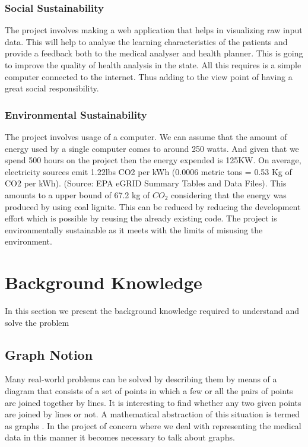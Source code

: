 \subsection{Social Sustainability}
The project involves making a web application that helps in visualizing raw input data.
This will help to analyse the learning characteristics of the patients and
provide a feedback both to the medical analyser and health planner. This is going to improve
the quality of health analysis in the state. All this requires is a simple computer connected to
the internet.  Thus  adding to the view point of having a great social responsibility.

\subsection{Environmental Sustainability}
The project involves usage of a computer. We can  assume that the amount of
energy used by a single computer comes to around 250 watts. And given that we spend 500
hours on the project then the energy expended is 125KW.  On average, electricity sources emit 1.22lbs CO2 per kWh (0.0006 metric tons = 0.53 Kg of CO2 per kWh). (Source: EPA eGRID Summary Tables and Data Files). This amounts to a upper bound of 67.2 kg of
$CO_2$ considering that the energy was produced by using coal lignite. This can be reduced
by reducing the development effort which is possible by reusing the already existing code. The project is environmentally sustainable as it meets with the limits of misusing the environment.
\chapter{Background Knowledge}
In this section we present the background knowledge required to understand and solve the problem
\section{Graph Notion}
Many real-world problems can be solved by describing them by means of a diagram that consists of a set of points in which a few or all the pairs of points are joined together by lines. It is interesting to find whether any two given points are joined by lines or not. A mathematical abstraction of this situation is termed as graphs 
\cite{BondyNMurthy}. In the project of concern where we deal with representing the medical data in this manner it becomes necessary to talk about graphs.

